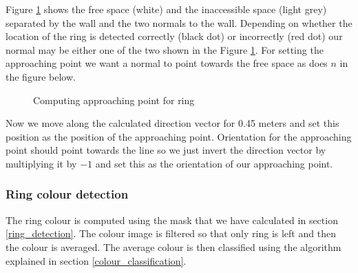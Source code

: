 \documentclass[12pt,a4paper]{article}
\begin{document}
	Figure \ref{fig:ring_approaching_point_computation} shows the free space (white) and the inaccessible space (light grey) separated by the wall and the two normals to the wall. Depending on whether the location of the ring is detected correctly (black dot) or incorrectly (red dot) our normal may be either one of the two shown in the Figure \ref{fig:ring_approaching_point_computation}. For setting the approaching point we want a normal to point towards the free space as does $n$ in the figure below. \\

	\begin{figure}[H]
		\centering
		\caption{Computing approaching point for ring}
		\label{fig:ring_approaching_point_computation}
	\end{figure}

	Now we move along the calculated direction vector for 0.45 meters and set this position as the position of the approaching point. Orientation for the approaching point should point towards the line so we just invert the direction vector by multiplying it by $-1$ and set this as the orientation of our approaching point. \\

	\subsubsection{Ring colour detection}
	The ring colour is computed using the mask that we have calculated in section \ref{ring_detection}. The colour  image is filtered so that only ring is left and then the colour is averaged. The average colour is then classified using the algorithm explained in section \ref{colour_classification}. \\
	
\end{document}
